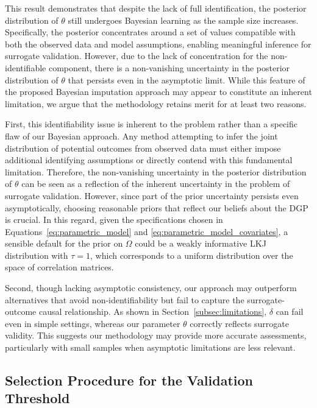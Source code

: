\documentclass[referee,usenatbib]{biom}
\begin{document}
This result demonstrates that despite the lack of full identification, the posterior distribution of \(\theta\) still undergoes Bayesian learning as the sample size increases. Specifically, the posterior concentrates around a set of values compatible with both the observed data and model assumptions, enabling meaningful inference for surrogate validation. However, due to the lack of concentration for the non-identifiable component, there is a non-vanishing uncertainty in the posterior distribution of \(\theta\) that persists even in the asymptotic limit. While this feature of the proposed Bayesian imputation approach may appear to constitute an inherent limitation, we argue that the methodology retains merit for at least two reasons.

First, this identifiability issue is inherent to the problem rather than a specific flaw of our Bayesian approach. Any method attempting to infer the joint distribution of potential outcomes from observed data must either impose additional identifying assumptions or directly contend with this fundamental limitation. Therefore, the non-vanishing uncertainty in the posterior distribution of \(\theta\) can be seen as a reflection of the inherent uncertainty in the problem of surrogate validation. However, since part of the prior uncertainty persists even asymptotically, choosing reasonable priors that reflect our beliefs about the DGP is crucial. In this regard, given the specifications chosen in Equations~\eqref{eq:parametric_model} and \eqref{eq:parametric_model_covariates}, a sensible default for the prior on \(\Omega\) could be a weakly informative LKJ distribution with \(\tau = 1\), which corresponds to a uniform distribution over the space of correlation matrices.

Second, though lacking asymptotic consistency, our approach may outperform alternatives that avoid non-identifiability but fail to capture the surrogate-outcome causal relationship. As shown in Section~\ref{subsec:limitations}, \(\delta\) can fail even in simple settings, whereas our parameter \(\theta\) correctly reflects surrogate validity. This suggests our methodology may provide more accurate assessments, particularly with small samples when asymptotic limitations are less relevant.

\subsection{Selection Procedure for the Validation Threshold}\label{subsec:alternative_threshold}
\end{document}
